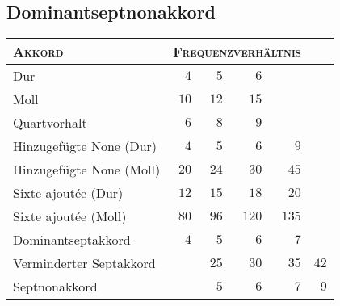 \subsection{Dominantseptnonakkord}

\begin{table}
	\centering
	\begin{tabular}{lrrrrr}
		\toprule
		\textsc{Akkord} & \multicolumn{4}{l}{\textsc{Frequenzverhältnis}}\\
		\midrule
		Dur                         & $4$  & $5$  & $6$\\
		Moll                        & $10$ & $12$ & $15$\\
		Quartvorhalt                & $6$  & $8$  & $9$\\
		Hinzugefügte None (Dur)     & $4$  & $5$  & $6$  & $9$\\
		Hinzugefügte None (Moll)    & $20$ & $24$ & $30$ & $45$\\
		Sixte ajoutée (Dur)         & $12$ & $15$ & $18$ & $20$\\
		Sixte ajoutée (Moll)        & $80$ & $96$ & $120$ & $135$\\
		Dominantseptakkord          & $4$  & $5$  & $6$  & $7$\\
		Verminderter Septakkord     &      & $25$ & $30$ & $35$ & $42$\\
		Septnonakkord               &      & $5$  & $6$  & $7$  & $9$\\
		\bottomrule
	\end{tabular}
\end{table}

